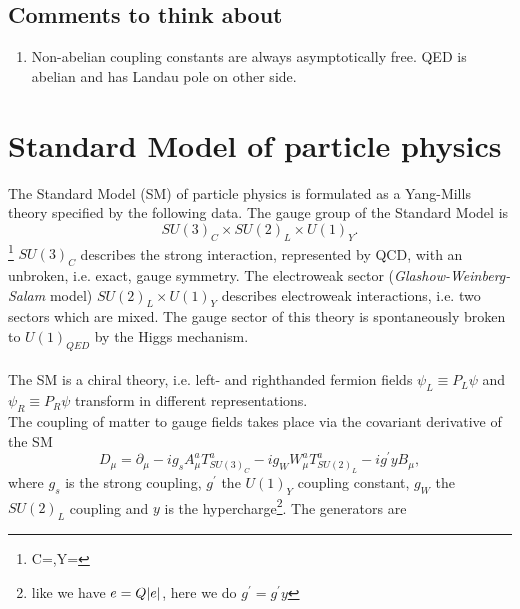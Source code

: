 \subsection{Comments to think about}
\begin{enumerate}
	\item Non-abelian coupling constants are always asymptotically free. QED is abelian and has Landau pole on other side.
\end{enumerate}

\section{Standard Model of particle physics}
\label{sec:sm}
The Standard Model (SM) of particle physics is formulated as a Yang-Mills theory specified by the following data.
The gauge group of the Standard Model is 
\begin{equation}
	SU(3)_C \times SU(2)_L \times U(1)_Y.
\end{equation}
\footnote{C=,Y=}
 $SU(3)_C$ describes the strong interaction, represented by QCD, with an unbroken, i.e. exact, gauge symmetry. The electroweak sector (\emph{Glashow-Weinberg-Salam} model) $SU(2)_L\times U(1)_Y$ describes electroweak interactions, i.e. two sectors which are mixed. The gauge sector of this theory is spontaneously broken to $U(1)_{QED}$ by the Higgs mechanism.\\
 \\
  The SM is a chiral theory, i.e.
 left- and righthanded fermion fields $ψ_L ≡ P_L ψ$ and $ψ_R ≡ P_R ψ$ transform in different representations. 
\\
The coupling of matter to gauge fields takes place via the covariant derivative of the SM
\begin{equation}
	D_\mu = \partial_\mu - i g_s A^a_\mu T^a_{SU(3)_C} - i g_W W^a_\mu T^a_{SU(2)_L} -i g^\prime y B_\mu,
\end{equation}
where $g_s$ is the strong coupling, $g^\prime$ the $U(1)_Y$ coupling constant, $g_W$ the $SU(2)_L$ coupling and $y$ is the hypercharge\footnote{like we have $e=Q \abs{e}$, here we do $g^\prime = g^\prime y$}. The generators are
